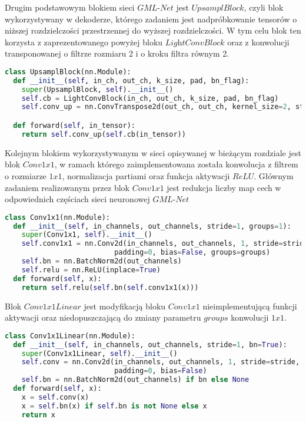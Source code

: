 \cell
Drugim podstawowym blokiem sieci $\textit{GML-Net}$ jest $\textit{UpsamplBlock}$, czyli blok wykorzystywany w dekoderze, którego zadaniem jest nadpróbkowanie tensorów o niższej rozdzielczości przestrzennej do wyższej rozdzielczości. W tym celu blok ten korzysta z zaprezentowanego powyżej bloku $\textit{LightConvBlock}$ oraz z konwolucji transponowanej o filtrze rozmiaru 2 i o kroku filtra równym 2.

\cell
\begin{lstlisting}[name=Rozdzial3.1, language=Python]
class UpsamplBlock(nn.Module):
  def __init__(self, in_ch, out_ch, k_size, pad, bn_flag):
    super(UpsamplBlock, self).__init__()
    self.cb = LightConvBlock(in_ch, out_ch, k_size, pad, bn_flag)
    self.conv_up = nn.ConvTranspose2d(out_ch, out_ch, kernel_size=2, stride=2)

  def forward(self, in_tensor):
    return self.conv_up(self.cb(in_tensor))
\end{lstlisting}


\cell
Kolejnym blokiem wykorzystywanym w sieci opisywanej w bieżącym rozdziale jest blok $\textit{Conv1x1}$, w ramach którego zaimplementowana została konwolucja z filtrem o rozmiarze $\textit{1x1}$, normalizacja partiami oraz funkcja aktywacji $\textit{ReLU}$. Głównym zadaniem realizowanym przez blok $\textit{Conv1x1}$ jest redukcja liczby map cech w odpowiednich częściach sieci neuronowej $\textit{GML-Net}$

\cell
\begin{lstlisting}[name=Rozdzial3.1, language=Python]
class Conv1x1(nn.Module):
  def __init__(self, in_channels, out_channels, stride=1, groups=1):
    super(Conv1x1, self).__init__()
    self.conv1x1 = nn.Conv2d(in_channels, out_channels, 1, stride=stride, 
                          padding=0, bias=False, groups=groups)
    self.bn = nn.BatchNorm2d(out_channels)
    self.relu = nn.ReLU(inplace=True)
  def forward(self, x):
    return self.relu(self.bn(self.conv1x1(x)))
\end{lstlisting}


\cell
Blok $\textit{Conv1x1Linear}$ jest modyfikacją bloku $\textit{Conv1x1}$ nieimplementującą funkcji aktywacji oraz niedopuszczającą do zmiany parametru $\textit{groups}$ konwolucji $\textit{1x1}$. 

\cell
\begin{lstlisting}[name=Rozdzial3.1, language=Python]
class Conv1x1Linear(nn.Module):
  def __init__(self, in_channels, out_channels, stride=1, bn=True):
    super(Conv1x1Linear, self).__init__()
    self.conv = nn.Conv2d(in_channels, out_channels, 1, stride=stride, 
                          padding=0, bias=False)
    self.bn = nn.BatchNorm2d(out_channels) if bn else None
  def forward(self, x):
    x = self.conv(x)
    x = self.bn(x) if self.bn is not None else x
    return x
\end{lstlisting}

